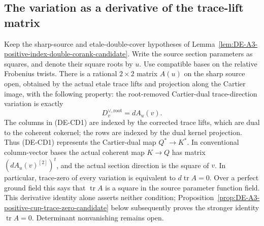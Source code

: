 \subsection{The variation as a derivative of the trace-lift matrix}

\begin{lemma}
\label{lem:DE-A3-positive-cup-derivative-candidate}
Keep the sharp-source and etale-double-cover hypotheses of
Lemma~\ref{lem:DE-A3-positive-index-double-corank-candidate}.
Write the source section parameters as squares, and denote their
square roots by $u$. Use compatible bases on the relative Frobenius
twists. There is a rational $2\times2$ matrix $A(u)$ on the sharp
source open, obtained by the actual etale trace lifts and projection
along the Cartier image, with the following property: the root-removed
Cartier-dual trace-direction variation is exactly
\[
                         D^{\vee,\mathrm{root}}_v=dA_u(v).
                                                        \tag{DE-CD1}
\]
The columns in (DE-CD1) are indexed by the corrected trace lifts,
which are dual to the coherent cokernel; the rows are indexed by the
dual kernel projection. Thus (DE-CD1) represents the Cartier-dual map
$Q^*\to K^*$. In conventional column-vector bases the actual coherent
map $K\to Q$ has matrix $(dA_u(v)^{[2]})^t$, and the actual section
direction is the square of $v$. In particular, trace-zero of every variation is equivalent
to $d\operatorname{tr}A=0$. Over a perfect ground field this says that
$\operatorname{tr}A$ is a square in the source parameter function field.
This derivative identity alone asserts neither condition;
Proposition~\ref{prop:DE-A3-positive-cup-trace-zero-candidate}
below subsequently proves the stronger identity $\operatorname{tr}A=0$.
Determinant nonvanishing remains open.
\end{lemma}
